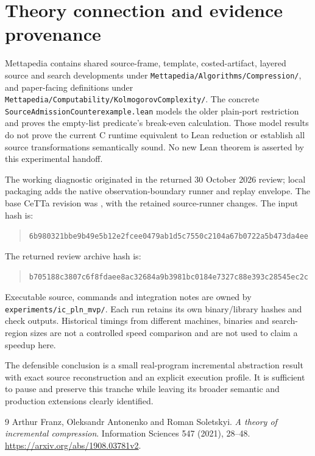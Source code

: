 \documentclass[11pt,a4paper]{article}
\newcommand{\code}[1]{\texttt{\detokenize{#1}}}
\newcommand{\file}[1]{\nolinkurl{#1}}
\begin{document}
\section{Theory connection and evidence provenance}

Mettapedia contains shared source-frame, template, costed-artifact, layered
source and search developments under \file{Mettapedia/Algorithms/Compression/},
and paper-facing definitions under
\file{Mettapedia/Computability/KolmogorovComplexity/}.
The concrete \file{SourceAdmissionCounterexample.lean} models the older
plain-port restriction and proves the empty-list predicate's break-even
calculation. Those model results do not prove the current C runtime equivalent
to Lean reduction or establish all source transformations semantically sound.
No new Lean theorem is asserted by this experimental handoff.

The working diagnostic originated in the returned 30 October 2026 review;
local packaging adds the native observation-boundary runner and replay envelope.
The base CeTTa revision was \code{45d3b058}, with the retained source-runner
changes. The input hash is:
\begin{quote}\small\file{6b980321bbe9b49e5b12e2fcee0479ab1d5c7550c2104a67b0722a5b473da4ee}\end{quote}
The returned review archive hash is:
\begin{quote}\small\file{b705188c3807c6f8fdaee8ac32684a9b3981bc0184e7327c88e393c28545ec2c}\end{quote}
Executable source, commands and integration notes are owned by
\file{experiments/ic_pln_mvp/}. Each run retains its own binary/library hashes
and check outputs. Historical timings from different machines, binaries and
search-region sizes are not a controlled speed comparison and are not used to
claim a speedup here.

The defensible conclusion is a small real-program incremental abstraction
result with exact source reconstruction and an explicit execution profile.
It is sufficient to pause and preserve this tranche while leaving its broader
semantic and production extensions clearly identified.

\begin{thebibliography}{9}
Arthur Franz, Oleksandr Antonenko and Roman Soletskyi.
\emph{A theory of incremental compression}.
Information Sciences 547 (2021), 28--48.
\url{https://arxiv.org/abs/1908.03781v2}.
\end{thebibliography}
\end{document}
